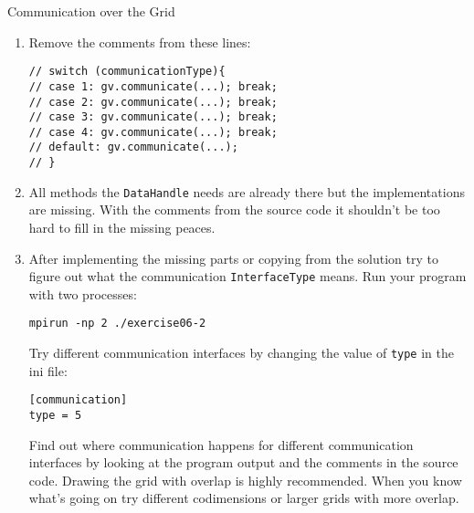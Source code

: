 \documentclass[12pt,a4paper]{article}
\begin{document}
\begin{Exercise}{Communication over the Grid}
  \begin{enumerate}
  \item Remove the comments from these lines:
    \begin{lstlisting}
// switch (communicationType){
// case 1: gv.communicate(...); break;
// case 2: gv.communicate(...); break;
// case 3: gv.communicate(...); break;
// case 4: gv.communicate(...); break;
// default: gv.communicate(...);
// }
    \end{lstlisting}
  \item All methods the \lstinline{DataHandle} needs are already there
    but the implementations are missing.  With the comments from the
    source code it shouldn't be too hard to fill in the missing
    peaces.
  \item After implementing the missing parts or copying from the
    solution try to figure out what the communication
    \lstinline{InterfaceType} means. Run your program with two
    processes:
    \begin{lstlisting}
mpirun -np 2 ./exercise06-2
    \end{lstlisting}
    Try different communication interfaces by changing the value of
    \lstinline{type} in the ini file:
    \begin{lstlisting}
[communication]
type = 5
    \end{lstlisting}
    Find out where communication happens for different communication
    interfaces by looking at the program output and the comments in
    the source code. Drawing the grid with overlap is highly
    recommended. When you know what's going on try different
    codimensions or larger grids with more overlap.
  \end{enumerate}
\end{Exercise}
\end{document}
